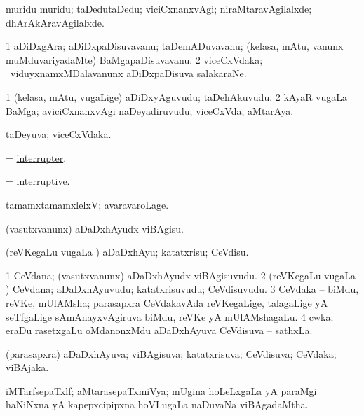 \bentry
{}
\gl{\kirxvi}
\bmng
muridu muridu; taDedutaDedu; viciCxnanxvAgi; niraMtaravAgilalxde; dhArAkAravAgilalxde. 
\emng
\eentry

\bentry
{}
\gl{\nA}
\bmng
\bnum
\num{1} aDiDxgAra; aDiDxpaDisuvavanu; taDemADuvavanu; (kelasa, mAtu, \mo vanunx muMduvariyadaMte) BaMgapaDisuvavanu. 
\num{2} viceCxVdaka; \kanmu\ viduyxnamxMDalavanunx aDiDxpaDisuva salakaraNe. 
\enum
\emng
\eentry

\bentry
{}
\gl{\nA}
\bmng
\bnum
\num{1} (kelasa, mAtu, \mo vugaLige) aDiDxyAguvudu; taDehAkuvudu. 
\num{2} kAyaR \mo vugaLa BaMga; aviciCxnanxvAgi naDeyadiruvudu; viceCxVda; aMtarAya. 
\enum
\emng
\eentry

\bentry
{}
\gl{\gu}
\bmng
taDeyuva; viceCxVdaka. 
\emng
\eentry

\bentry
{}
\gl{\nA}
\bmng
=  \hyperlink{interrupter}{interrupter}. 
\emng
\eentry

\bentry
{}
\gl{\gu}
\bmng
=  \hyperlink{interruptive}{interruptive}. 
\emng
\eentry

\bentry
{}
\gl{\kirxvi}
\expl{\Latin}
\bmng
tamamxtamamxlelxV; avaravaroLage. 
\emng
\eentry

\bentry
{}
\gl{\sakirx}
\bmng
(vasutxvanunx) aDaDxhAyudx viBAgisu. 
\emng

\noindent
\gl{\akirx}
\bmng
(reVKegaLu \mo vugaLa \vi) aDaDxhAyu; katatxrisu; CeVdisu. 
\emng
\eentry

\bentry
{}
\gl{\nA}
\bmng
\bnum
\num{1} CeVdana; (vasutxvanunx) aDaDxhAyudx viBAgisuvudu. 
\num{2} (reVKegaLu \mo vugaLa \vi) CeVdana; aDaDxhAyuvudu; katatxrisuvudu; CeVdisuvudu. 
\num{3} CeVdaka -- biMdu, reVKe, mUlAMsha; parasapxra CeVdakavAda reVKegaLige, talagaLige yA seTfgaLige sAmAnayxvAgiruva biMdu, reVKe yA mUlAMshagaLu. 
\num{4} cwka; eraDu rasetxgaLu oMdanonxMdu aDaDxhAyuva CeVdisuva -- sathxLa. 
\enum
\emng
\eentry

\bentry
{}
\gl{\gu}
\bmng
(parasapxra) aDaDxhAyuva; viBAgisuva; katatxrisuva; CeVdisuva; CeVdaka; viBAjaka. 
\emng
\eentry

\bentry
{}
\gl{\gu}
\bmng
iMTarfsepaTxlf; aMtarasepaTxmiVya; mUgina hoLeLxgaLa yA paraMgi haNiNxna yA kapepxcipipxna hoVLugaLa naDuvaNa viBAgadaMtha. 
\emng
\eentry


